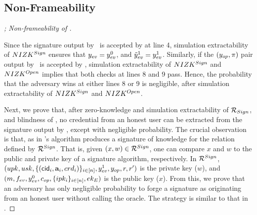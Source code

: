 \subsection{Non-Frameability}

\begin{proof}[; Non-frameability of \CUASGen]
  \label{prf:frame-uas}


  Since the signature output by \adv~is accepted by \Verify at line 4,
  simulation extractability of $NIZK^{Sign}$ ensures that $y_{ev} = y_{ev}^0$,
  and $\tilde{y}_{ev}^1 = y_{ev}^1$. Similarly, if the $(y_{op},\pi)$
  pair output by \adv~is accepted by \Judge, simulation extractability of
  $NIZK^{Sign}$ and $NIZK^{Open}$ implies that both checks at lines 8 and 9
  pass. Hence, the probability that the adversary wins at either lines 8 or 9 is
  negligible, after simulation extractability of $NIZK^{Sign}$ and
  $NIZK^{Open}$.

  Next, we prove that, after zero-knowledge and simulation extractability of
  $\mathcal{R}_{Sign}$, and blindness of \SBCM, no credential from an honest user
  can be extracted from the signature output by \adv, except with negligible
  probability.
  The crucial observation is that, as in \cite{cl06} \CUASGen's \Sign algorithm
  produces a signature of knowledge for the relation defined by
  $\mathcal{R}^{Sign}$. That is, given $(x,w) \in \mathcal{R}^{Sign}$, one can
  compare $x$ and $w$ to the public and private key of a signature algorithm,
  respectively. In $\mathcal{R}^{Sign}$, $(upk,usk,\lbrace (\mathsf{cid}_i,\mathbf{a}_i,
  crd_i)\rbrace_{i\in[n]},y_{ev}^1,y_{op},r,r')$ is the private key ($w$), and
  $(m,f_{ev},y_{ev}^0,c_{op},\lbrace ipk_i \rbrace_{i\in[n]},ek_{E})$ is the
  public key ($x$).
  From this, we prove that an adversary has only negligible probability to forge
  a signature as originating from an honest user without calling the \SIGN
  oracle. The strategy is similar to that in \cite[Theorem 2.1]{cl06}.


\end{proof}

